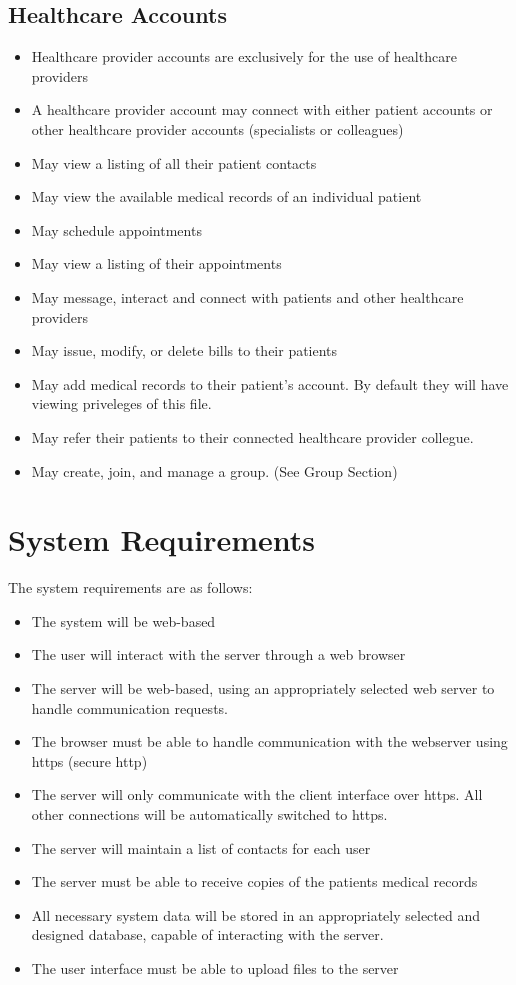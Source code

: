 \section{Healthcare Accounts}
\begin{itemize}
\item Healthcare provider accounts are exclusively for the use of healthcare providers
\item A healthcare provider account may connect with either patient accounts or other healthcare provider accounts (specialists or colleagues)
\item May view a listing of all their patient contacts
\item May view the available medical records of an individual patient
\item May schedule appointments
\item May view a listing of their appointments
\item May message, interact and connect with patients and other healthcare providers
\item May issue, modify, or delete bills to their patients
\item May add medical records to their patient's account. By default they will have viewing priveleges of this file.
\item May refer their patients to their connected healthcare provider collegue.
\item May create, join, and manage a group. (See Group Section)
\end{itemize}

\chapter{System Requirements}
The system requirements are as follows:
\begin{itemize}
\item The system will be web-based
\item The user will interact with the server through a web browser
\item The server will be web-based, using an appropriately selected web server to handle communication requests.
\item The browser must be able to handle communication with the webserver using https (secure http)
\item The server will only communicate with the client interface over https.  All other connections will be automatically switched to https.
\item The server will maintain a list of contacts for each user
\item The server must be able to receive copies of the patients medical records
\item All necessary system data will be stored in an appropriately selected and designed database, capable of interacting with the server.
\item The user interface must be able to upload files to the server
\end{itemize}

